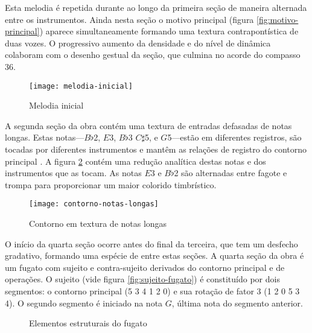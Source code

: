 Esta melodia é repetida durante ao longo da primeira seção de maneira
alternada entre os instrumentos. Ainda nesta seção o motivo principal
(figura \ref{fig:motivo-principal}) aparece simultaneamente formando
uma textura contrapontística de duas vozes. O progressivo aumento da
densidade e do nível de dinâmica colaboram com o desenho gestual da
seção, que culmina no acorde do compasso 36.

\begin{figure}
  \centering
  \texttt{[image: melodia-inicial]}
  \caption{Melodia inicial}
  \label{fig:melodia-inicial}
\end{figure}

A segunda seção da obra contém uma textura de entradas defasadas de
notas longas. Estas notas---$B\flat$2, $E$3, $B\flat$3 $C\sharp$5, e
$G$5---estão em diferentes registros, são tocadas por diferentes
instrumentos e mantêm as relações de registro do contorno principal
\contpr{}. A figura \ref{fig:contorno-notas-longas} contém uma redução
analítica destas notas e dos instrumentos que as tocam. As notas $E$3
e $B\flat$2 são alternadas entre fagote e trompa para proporcionar um
maior colorido timbrístico.

\begin{figure}
  \centering
  \texttt{[image: contorno-notas-longas]}
  \caption{Contorno em textura de notas longas}
  \label{fig:contorno-notas-longas}
\end{figure}

O início da quarta seção ocorre antes do final da terceira, que tem um
desfecho gradativo, formando uma espécie de  entre estas
seções. A quarta seção da obra é um fugato com sujeito e
contra-sujeito derivados do contorno principal e de operações. O
sujeito (vide figura \ref{fig:sujeito-fugato}) é constituído por dois
segmentos: o contorno principal (5 3 4 1 2 0) e sua rotação de fator 3
(1 2 0 5 3 4). O segundo segmento é iniciado na nota $G$, última nota
do segmento anterior.

\begin{figure}
  \centering

  \caption{Elementos estruturais do fugato}
  \label{fig:elementos-fugato}
\end{figure}

